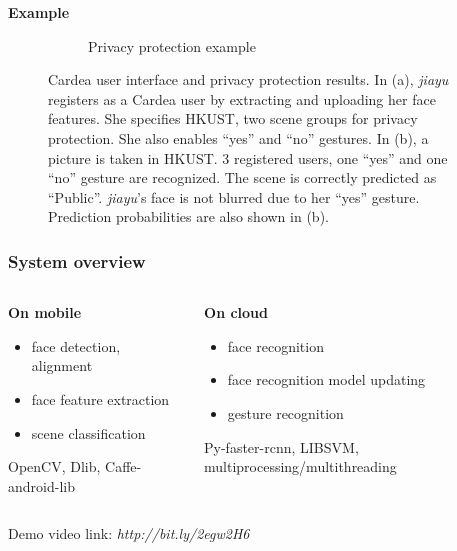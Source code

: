 \begin{frame}[t]
{\begin{block}{\bf Example}
\begin{figure}[!htbp]
{{\begin{subfigure}[b]{0.43\textwidth}
        \caption{\scriptsize Privacy protection example}
        \label{fig:ch4-allres}
      \end{subfigure}
    }
  }
  \vspace{-0.25cm}
  \caption{\tiny Cardea user interface and privacy protection results. In (a), \textit{jiayu} registers as a Cardea user by extracting and uploading her face features. She specifies HKUST, two scene groups for privacy protection. She also enables ``yes'' and ``no'' gestures. In (b), a picture is taken in HKUST. 3 registered users, one ``yes'' and one ``no'' gesture are recognized. The scene is correctly predicted as ``Public''. \textit{jiayu}'s face is not blurred due to her ``yes'' gesture. Prediction probabilities are also shown in (b).}
\end{figure}
\end{block}
}

\end{frame}

\begin{frame}[t]
\frametitle{System overview}

\begin{columns}[T]
\begin{column}{0.44\textwidth}
  \begin{block}{\bf On mobile}
    \begin{itemize}
      \item face detection, alignment
      \item face feature extraction
      \item scene classification
    \end{itemize}
    {\scriptsize  OpenCV, Dlib, Caffe-android-lib}
  \end{block}
\end{column}\hfill
\begin{column}{0.5\textwidth}
  \begin{block}{\bf On cloud}
    \begin{itemize}
      \item face recognition
      \item face recognition model updating
      \item gesture recognition
    \end{itemize}
    {\scriptsize Py-faster-rcnn, LIBSVM, multiprocessing/multithreading}
  \end{block}
\end{column}
\end{columns}

\vspace{1cm}
{\scriptsize  Demo video link: \em http://bit.ly/2egw2H6}


\end{frame}


